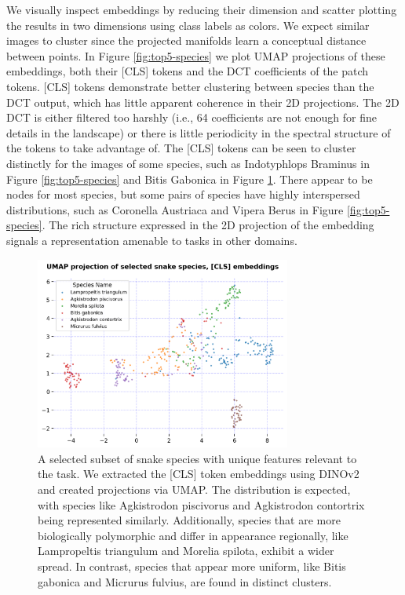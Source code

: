 \documentclass[]{ceurart}
\begin{document}
We visually inspect embeddings by reducing their dimension and scatter plotting the results in two dimensions using class labels as colors.
We expect similar images to cluster since the projected manifolds learn a conceptual distance between points.
In Figure \ref{fig:top5-species} we plot UMAP \cite{mcinnes2018umap} projections of these embeddings, both their [CLS] tokens and the DCT coefficients of the patch tokens.
[CLS] tokens demonstrate better clustering between species than the DCT output, which has little apparent coherence in their 2D projections.
The 2D DCT is either filtered too harshly (i.e., 64 coefficients are not enough for fine details in the landscape) or there is little periodicity in the spectral structure of the tokens to take advantage of.
The [CLS] tokens can be seen to cluster distinctly for the images of some species, such as Indotyphlops Braminus in Figure \ref{fig:top5-species} and Bitis Gabonica in Figure \ref{fig:selected-species}. 
There appear to be nodes for most species, but some pairs of species have highly interspersed distributions, such as Coronella Austriaca and Vipera Berus in Figure \ref{fig:top5-species}. 
The rich structure expressed in the 2D projection of the embedding signals a representation amenable to tasks in other domains.

\begin{figure}[t]
    \centering
    \includegraphics[width=0.75\textwidth]{media/UMAP-selected-snakes.png}
    \caption{
    A selected subset of snake species with unique features relevant to the task.
    We extracted the [CLS] token embeddings using DINOv2 and created projections via UMAP.
    The distribution is expected, with species like Agkistrodon piscivorus and Agkistrodon contortrix being represented similarly. Additionally, species that are more biologically polymorphic and differ in appearance regionally, like Lampropeltis triangulum and Morelia spilota, exhibit a wider spread. 
    In contrast, species that appear more uniform, like Bitis gabonica and Micrurus fulvius, are found in distinct clusters. 
    }
  \label{fig:selected-species}
\end{figure}
\end{document}
